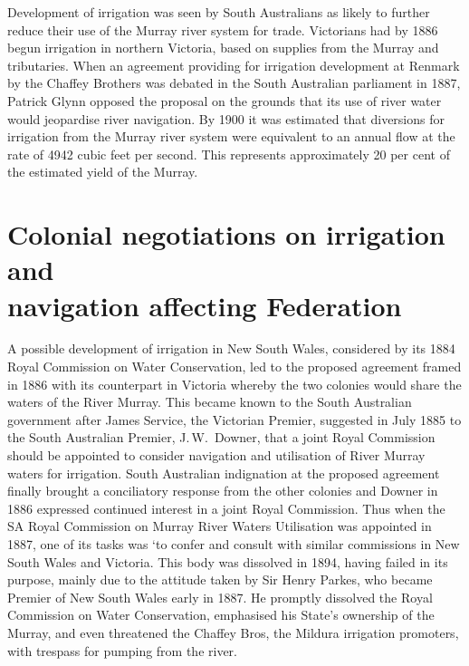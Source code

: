 Development of irrigation was seen by South Australians as likely to
further reduce their use of the Murray river system for trade.
Victorians had by 1886 begun irrigation in northern Victoria, based on
supplies from the Murray and tributaries.  When an agreement providing
for irrigation development at Renmark  by the
Chaffey Brothers  was debated in the South
Australian parliament in 1887, Patrick Glynn 
opposed the proposal on the grounds that its use of river water would
jeopardise river navigation. By 1900 it was estimated that diversions
for irrigation from the Murray river system were equivalent to an
annual flow at the rate of 4942 cubic feet per second. This represents
approximately 20 per cent of the estimated yield of the
Murray.

\section*{Colonial negotiations on irrigation and \\
navigation affecting Federation}

A possible development of irrigation in New South Wales, considered by
its 1884 Royal Commission on Water Conservation,  led to the proposed agreement
framed in 1886 with its counterpart in Victoria where\-by the two
colonies would share the waters of the River Murray. This became known
to the South Australian government after James Service,
 the Victorian Premier, suggested in July 1885 to
the South Australian Premier, J.\,W.~Downer, 
that a joint Royal Commission should be appointed to consider
navigation and utilisation of River Murray waters for irrigation.
South Australian indignation at the proposed agreement finally brought
a conciliatory response from the other colo\-nies and Downer in 1886
expressed continued interest in a joint Royal Commission.  Thus when
the SA Royal Commission on Murray River Waters Utilisation was
appointed in 1887,  one of its tasks was `to confer and consult with similar
commissions in New South Wales and Victoria.  This body was dissolved
in 1894, having failed in its purpose, mainly due to the attitude
taken by Sir Henry Parkes,  who became Premier of
New South Wales early in 1887.  He promptly dissolved the Royal
Commission on Water Conservation, emphasised his State's ownership of
the Murray, and even threatened the Chaffey Bros, the Mildura
irrigation promoters, with trespass for pumping from the river.

